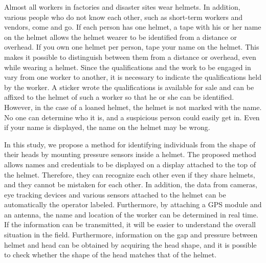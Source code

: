 \documentclass[sigchi,authordraft]{acmart}
\begin{document}

Almost all workers in factories and disaster sites wear helmets. In addition, various people who do not know each other, such as short-term workers and vendors, come and go. If each person has one helmet, a tape with his or her name on the helmet allows the helmet wearer to be identified from a distance or overhead. If you own one helmet per person, tape your name on the helmet. This makes it possible to distinguish between them from a distance or overhead, even while wearing a helmet. Since the qualifications and the work to be engaged in vary from one worker to another, it is necessary to indicate the qualifications held by the worker. A sticker wrote the qualifications is available for sale and can be affixed to the helmet of such a worker so that he or she can be identified. However, in the case of a loaned helmet, the helmet is not marked with the name. No one can determine who it is, and a suspicious person could easily get in. Even if your name is displayed, the name on the helmet may be wrong.\par


In this study, we propose a method for identifying individuals from the shape of their heads by mounting pressure sensors inside a helmet. The proposed method allows names and credentials to be displayed on a display attached to the top of the helmet. Therefore, they can recognize each other even if they share helmets, and they cannot be mistaken for each other. In addition, the data from cameras, eye tracking devices and various sensors attached to the helmet can be automatically the operator labeled. Furthermore, by attaching a GPS module and an antenna\cite{disaster_en}, the name and location of the worker can be determined in real time. If the information can be transmitted, it will be easier to understand the overall situation in the field. Furthermore, information on the gap and pressure between helmet and head can be obtained by acquiring the head shape, and it is possible to check whether the shape of the head matches that of the helmet.\par
\end{document}
